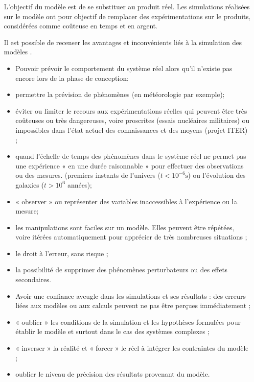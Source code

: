 L'objectif du modèle est de se substituer au produit réel. Les simulations réalisées sur le modèle ont pour objectif de remplacer des expérimentations sur le produits, considérées comme coûteuse en temps et en argent. 

Il est possible de recenser les avantages et inconvénients liés à la simulation des modèles \cite{1}. 
\begin{itemize}[label=]
\item Pouvoir prévoir le comportement du système réel alors qu'il n’existe pas encore lors de la phase de conception;
\item permettre la prévision de phénomènes (en météorologie par exemple);
\item éviter ou limiter le recours aux expérimentations réelles qui peuvent être très
coûteuses ou très dangereuses, voire proscrites (essais nucléaires militaires) ou
impossibles dans l’état actuel des connaissances et des moyens (projet ITER) ;
\item quand l’échelle de temps des phénomènes dans le système réel ne permet pas une
expérience « en une durée raisonnable » pour effectuer des observations ou des mesures.
(premiers instants de l’univers ($t < 10^{-6} \text{s}$) ou l'évolution des galaxies
($t>10^6$ années);
\item « observer » ou représenter des variables inaccessibles à l'expérience ou la mesure;
\item les manipulations sont faciles sur un modèle. Elles peuvent être répétées, voire itérées
automatiquement pour apprécier de très nombreuses situations ;
\item le droit à l’erreur, sans risque ;
\item la possibilité de supprimer des phénomènes perturbateurs ou des effets
secondaires.
\end{itemize}

\begin{itemize}[label=]
\item Avoir une confiance aveugle dans les simulations et ses résultats : des erreurs liées aux
modèles ou aux calculs peuvent ne pas être perçues immédiatement ;
\item « oublier » les conditions de la simulation et les hypothèses formulées pour établir le
modèle et surtout dans le cas des systèmes complexes ;
\item « inverser » la réalité et « forcer » le réel à intégrer les contraintes du modèle ;
\item oublier le niveau de précision des résultats provenant du modèle.
\end{itemize}


